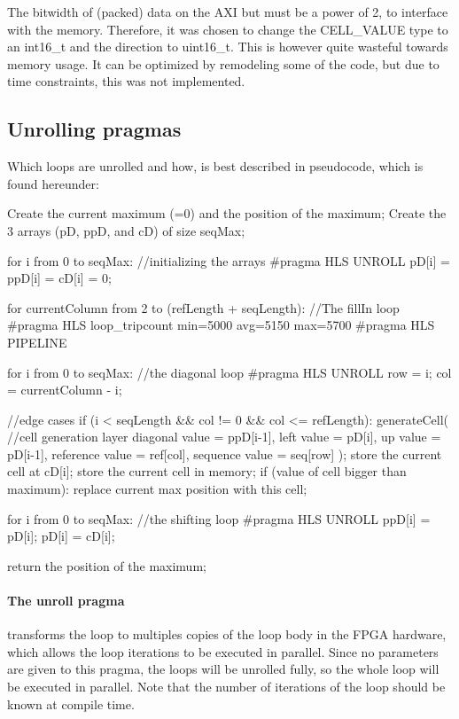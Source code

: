 The bitwidth of (packed) data on the AXI but must be a power of 2, to interface with the memory. Therefore, it was chosen to change the CELL\_VALUE type to an int16\_t and the direction to uint16\_t. This is however quite wasteful towards memory usage. It can be optimized by remodeling some of the code, but due to time constraints, this was not implemented.

\subsection{Unrolling pragmas}
Which loops are unrolled and how, is best described in pseudocode, which is found hereunder:

\begin{lcverbatim}
Create the current maximum (=0) and the position of the maximum;
Create the 3 arrays (pD, ppD, and cD) of size seqMax;

for i from 0 to seqMax: //initializing the arrays
   #pragma HLS UNROLL
   pD[i] = ppD[i] = cD[i] = 0;

for currentColumn from 2 to (refLength + seqLength): //The fillIn loop
   #pragma HLS loop_tripcount min=5000 avg=5150 max=5700
   #pragma HLS PIPELINE
	
   for i from 0 to seqMax: //the diagonal loop
      #pragma HLS UNROLL
      row = i;
      col = currentColumn - i;
      
      //edge cases
      if (i < seqLength && col != 0 && col <= refLength):
         generateCell(  //cell generation layer
         	diagonal value = ppD[i-1], 
         	left value = pD[i], 
         	up value = pD[i-1],
         	reference value = ref[col],
         	sequence value = seq[row]
         );
         store the current cell at cD[i];
         store the current cell in memory;
         if (value of cell bigger than maximum):
            replace current max position with this cell;
	
	
   for i from 0 to seqMax: //the shifting loop
      #pragma HLS UNROLL
      ppD[i] = pD[i];
      pD[i] = cD[i];

return the position of the maximum;
\end{lcverbatim}

\paragraph{The unroll pragma} transforms the loop to multiples copies of the loop body in the FPGA hardware, which allows the loop iterations to be executed in parallel. Since no parameters are given to this pragma, the loops will be unrolled fully, so the whole loop will be executed in parallel. Note that the number of iterations of the loop should be known at compile time.

